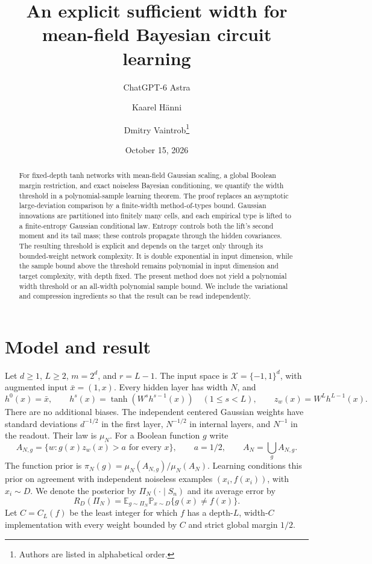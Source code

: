 \documentclass[11pt]{article}
\title{An explicit sufficient width for\\mean-field Bayesian circuit learning}
\author{ChatGPT-6 Astra \and Kaarel H\"anni \and Dmitry Vaintrob\thanks{Authors are listed in alphabetical order.}}
\date{October 15, 2026}
\theoremstyle{remark}\newtheorem{remark}[theorem]{Remark}
\newcommand{\E}{\mathbb E}\newcommand{\Prb}{\mathbb P}\newcommand{\R}{\mathbb R}
\begin{document}
\maketitle
\begin{abstract}
For fixed-depth tanh networks with mean-field Gaussian scaling, a global
Boolean margin restriction, and exact noiseless Bayesian conditioning, we
quantify the width threshold in a polynomial-sample learning theorem.
The proof replaces an asymptotic large-deviation comparison by a finite-width
method-of-types bound. Gaussian innovations are partitioned into finitely many
cells, and each empirical type is lifted to a finite-entropy Gaussian
conditional law. Entropy controls both the lift's second moment and its tail
mass; these controls propagate through the hidden covariances.
The resulting threshold is explicit and depends on the target only through
its bounded-weight network complexity. It is double exponential in input
dimension, while the sample bound above the threshold remains polynomial in
input dimension and target complexity, with depth fixed. The present
method does not yield a polynomial width threshold or an all-width
polynomial sample bound. We include the variational and compression ingredients
so that the result can be read independently.
\end{abstract}

\section{Model and result}
Let $d\geq1$, $L\geq2$, $m=2^d$, and $r=L-1$. The input space is
$\mathcal X=\{-1,1\}^d$, with augmented input $\bar x=(1,x)$.
Every hidden layer has width $N$, and
\[
 h^0(x)=\bar x,\qquad h^s(x)=\tanh(W^sh^{s-1}(x))\quad(1\leq s<L),
 \qquad z_w(x)=W^Lh^{L-1}(x).
\]
There are no additional biases. The independent centered Gaussian weights
have standard deviations $d^{-1/2}$ in the first layer, $N^{-1/2}$ in
internal layers, and $N^{-1}$ in the readout. Their law is $\mu_N$.
For a Boolean function $g$ write
\[
 A_{N,g}=\{w:g(x)z_w(x)>a\text{ for every }x\},\qquad a=1/2,
 \qquad A_N=\bigcup_g A_{N,g}.
\]
The function prior is $\pi_N(g)=\mu_N(A_{N,g})/\mu_N(A_N)$.
Learning conditions this prior on agreement with independent noiseless
examples $(x_i,f(x_i))$, with $x_i\sim D$. We denote the posterior by
$\Pi_N(\cdot\mid S_n)$ and its average error by
\[
 R_D(\Pi_N)=\E_{g\sim\Pi_N}\Prb_{x\sim D}\{g(x)\ne f(x)\}.
\]
Let $C=C_L(f)$ be the least integer for which $f$ has a depth-$L$,
width-$C$ implementation with every weight bounded by $C$ and strict global
margin $1/2$.
\end{document}

